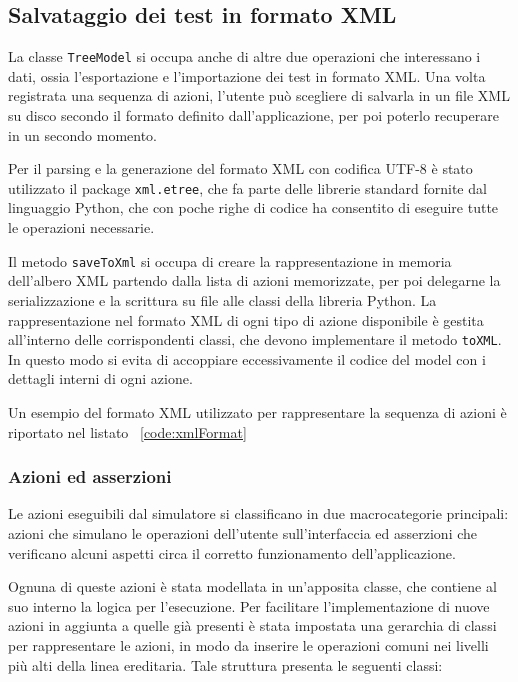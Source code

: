 \documentclass[12pt]{toptesi}
\begin{document}

 
\subsection{Salvataggio dei test in formato XML}

La classe \verb|TreeModel| si occupa anche di altre due operazioni che interessano i dati, ossia l'esportazione e l'importazione dei test in formato XML. Una volta registrata una sequenza di azioni, l'utente può scegliere di salvarla in un file XML su disco secondo il formato definito dall'applicazione, per poi poterlo recuperare in un secondo momento.

Per il parsing e la generazione del formato XML con codifica UTF-8 è stato utilizzato il package \verb|xml.etree|, che fa parte delle librerie standard fornite dal linguaggio Python, che con poche righe di codice ha consentito di eseguire tutte le operazioni necessarie.

Il metodo \verb|saveToXml| si occupa di creare la rappresentazione in memoria dell'albero XML partendo dalla lista di azioni memorizzate, per poi delegarne la serializzazione e la scrittura su file alle classi della libreria Python. La rappresentazione nel formato XML di ogni tipo di azione disponibile è gestita all'interno delle corrispondenti classi, che devono implementare il metodo \verb|toXML|. In questo modo si evita di accoppiare eccessivamente il codice del model con i dettagli interni di ogni azione.

Un esempio del formato XML utilizzato per rappresentare la sequenza di azioni è riportato nel listato ~\ref{code:xmlFormat} 



\subsubsection{Azioni ed asserzioni}

Le azioni eseguibili dal simulatore si classificano in due macrocategorie principali: azioni che simulano le operazioni dell'utente sull'interfaccia ed asserzioni che verificano alcuni aspetti circa il corretto funzionamento dell'applicazione.

Ognuna di queste azioni è stata modellata in un'apposita classe, che contiene al suo interno la logica per l'esecuzione. Per facilitare l'implementazione di nuove azioni in aggiunta a quelle già presenti è stata impostata una gerarchia di classi per rappresentare le azioni, in modo da inserire le operazioni comuni nei livelli più alti della linea ereditaria. Tale struttura presenta le seguenti classi:
\end{document}
